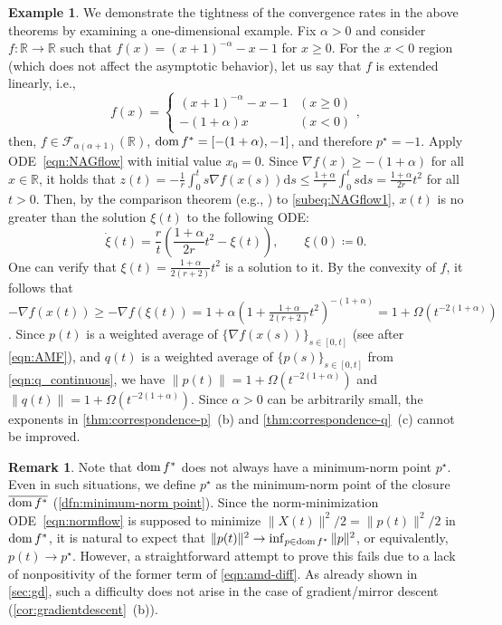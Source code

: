 \documentclass[11pt,a4paper]{article}
\theoremstyle{definition}
\newtheorem{rem}{Remark}[section]
\newtheorem{eg}{Example}[section]
\theoremstyle{plain}
\newcommand{\RR}{{\mathbb{R}}}
\newcommand{\rmd}{{\mathrm{d}}}
\newcommand{\dom}{\mathop{\rm dom}}
\begin{document}
\begin{eg}\label{eg:tight}
    We demonstrate the tightness of the convergence rates in the above theorems by examining a one-dimensional example.
    Fix $\alpha > 0$ and consider $f: \RR \to \RR$ such that $f(x) = (x + 1)^{-\alpha} - x - 1$ for $x \ge 0$.
    For the $x < 0$ region (which does not affect the asymptotic behavior), let us say that $f$ is extended linearly, i.e.,
    \[
        f(x) = \begin{cases}
            (x + 1)^{-\alpha} - x - 1 & (x \ge 0)\\
            -(1 + \alpha)x & (x < 0)
        \end{cases},
    \]
    then, $f \in \mathcal{F}_{\alpha(\alpha + 1)}(\RR)$, $\dom f^\ast = [-(1 + \alpha), -1]$, and therefore $p^\star = -1$.
    Apply ODE~\eqref{eqn:NAGflow} with initial value $x_0 = 0$.
    Since $\nabla f(x) \ge -(1 + \alpha)$ for all $x \in \RR$, it holds that $z(t) = -\frac1r\int_0^ts\nabla f(x(s))\rmd s \le \frac{1 + \alpha}r\int_0^ts\rmd s = \frac{1 + \alpha}{2r}t^2$ for all $t > 0$.
    Then, by the comparison theorem (e.g., \cite[(16.4)~Lemma]{Amann1990}) to \eqref{subeq:NAGflow1}, $x(t)$ is no greater than the solution $\xi(t)$ to the following ODE:
    \[
        \dot \xi(t) = \frac{r}t\left(\frac{1 + \alpha}{2r}t^2 - \xi(t)\right), \qquad \xi(0) \coloneqq 0.
    \]
    One can verify that $\xi(t) = \frac{1 + \alpha}{2(r + 2)}t^2$ is a solution to it.
    By the convexity of $f$, it follows that $-\nabla f(x(t)) \ge -\nabla f(\xi(t)) = 1 + \alpha\left(1 + \frac{1 + \alpha}{2(r + 2)}t^2\right)^{-(1 + \alpha)} = 1 + \Omega(t^{-2(1 + \alpha)})$.
    Since $p(t)$ is a weighted average of $\{\nabla f(x(s))\}_{s \in [0, t]}$ (see after \eqref{eqn:AMF}), and $q(t)$ is a weighted average of $\{p(s)\}_{s \in [0, t]}$ from \eqref{eqn:q_continuous}, we have $\|p(t)\| = 1 + \Omega(t^{-2(1 + \alpha)})$ and $\|q(t)\| = 1 + \Omega(t^{-2(1 + \alpha)})$.
    Since $\alpha > 0$ can be arbitrarily small, the exponents in \cref{thm:correspondence-p}~(b) and \cref{thm:correspondence-q}~(c) cannot be improved.
\end{eg}

\begin{rem}
    Note that $\dom f^\ast$ does not always have a minimum-norm point $p^\star$.
    Even in such situations, we define $p^\star$ as the minimum-norm point of the closure $\overline{\dom f^\ast}$ (\cref{dfn:minimum-norm point}).
    Since the norm-minimization ODE~\eqref{eqn:normflow} is supposed to minimize $\|X(t)\|^2/2 = \|p(t)\|^2/2$ in $\dom f^\ast$, it is natural to expect that $\|p(t)\|^2 \to \inf_{p \in \dom f^\ast}\|p\|^2$, or equivalently, $p(t) \to p^\star$.
    However, a straightforward attempt to prove this fails due to a lack of nonpositivity of the former term of \eqref{eqn:amd-diff}.
    As already shown in \cref{sec:gd}, such a difficulty does not arise in the case of gradient/mirror descent (\cref{cor:gradientdescent}~(b)).
\end{rem}
\end{document}
